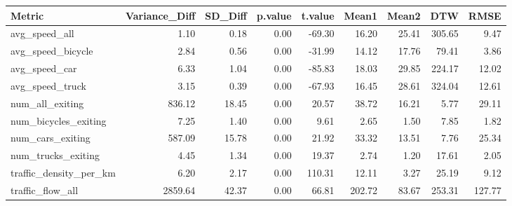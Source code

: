 \begin{table}[ht]
\centering
\begin{tabular}{lrrrrrrrr}
  \hline
Metric & Variance\_Diff & SD\_Diff & p.value & t.value & Mean1 & Mean2 & DTW & RMSE \\ 
  \hline
avg\_speed\_all & 1.10 & 0.18 & 0.00 & -69.30 & 16.20 & 25.41 & 305.65 & 9.47 \\ 
  avg\_speed\_bicycle & 2.84 & 0.56 & 0.00 & -31.99 & 14.12 & 17.76 & 79.41 & 3.86 \\ 
  avg\_speed\_car & 6.33 & 1.04 & 0.00 & -85.83 & 18.03 & 29.85 & 224.17 & 12.02 \\ 
  avg\_speed\_truck & 3.15 & 0.39 & 0.00 & -67.93 & 16.45 & 28.61 & 324.04 & 12.61 \\ 
  num\_all\_exiting & 836.12 & 18.45 & 0.00 & 20.57 & 38.72 & 16.21 & 5.77 & 29.11 \\ 
  num\_bicycles\_exiting & 7.25 & 1.40 & 0.00 & 9.61 & 2.65 & 1.50 & 7.85 & 1.82 \\ 
  num\_cars\_exiting & 587.09 & 15.78 & 0.00 & 21.92 & 33.32 & 13.51 & 7.76 & 25.34 \\ 
  num\_trucks\_exiting & 4.45 & 1.34 & 0.00 & 19.37 & 2.74 & 1.20 & 17.61 & 2.05 \\ 
  traffic\_density\_per\_km & 6.20 & 2.17 & 0.00 & 110.31 & 12.11 & 3.27 & 25.19 & 9.12 \\ 
  traffic\_flow\_all & 2859.64 & 42.37 & 0.00 & 66.81 & 202.72 & 83.67 & 253.31 & 127.77 \\ 
   \hline
\end{tabular}
\end{table}
